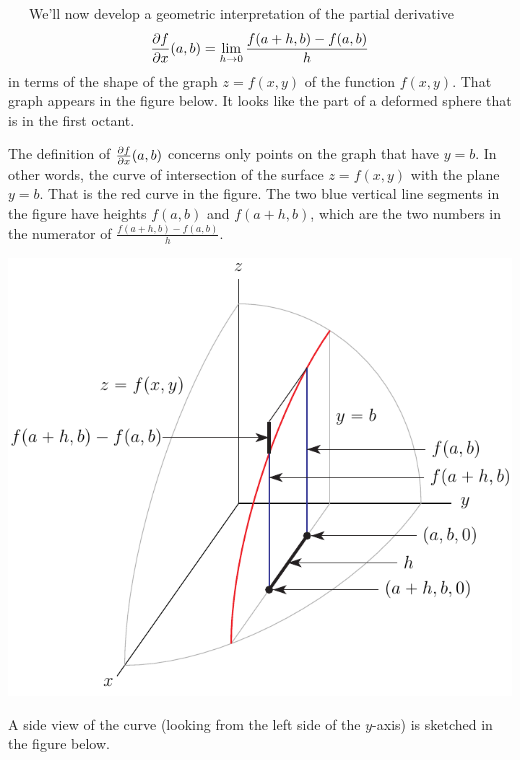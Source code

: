 \begin{remark}
     \label{rem geom interp}

\ \ \ 
We'll now develop a geometric interpretation of the partial derivative
\begin{equation*}
\pdiff{f}{x}(a,b)  = \lim_{h\rightarrow 0}\frac{f(a+h,b) - f(a,b)}{h}
\end{equation*}
in terms of the shape of the graph $z=f(x,y)$ of the function $f(x,y)$.
That graph appears in the figure below. It looks like the part of
a deformed sphere that is in the first octant. 

The definition of $\pdiff{f}{x}(a,b)$ concerns 
only points on the graph that have $y=b$. 
In other words, the curve of intersection of the
surface $z=f(x,y)$ with the plane $y=b$. That is the red curve in the figure.
The two blue vertical line segments in the figure have heights $f(a,b)$ and
$f(a+h,b)$, which are the two numbers in the numerator 
of $\frac{f(a+h,b) - f(a,b)}{h}$. 
\begin{efig}
\begin{center}
   \includegraphics{xderiv.pdf}
\end{center}
\end{efig}
A side view of the curve (looking from the left side of the $y$-axis)
is sketched in the figure below.
\vadjust{
\begin{efig}
\begin{center}

\end{center}
\end{efig}}
\end{remark}
